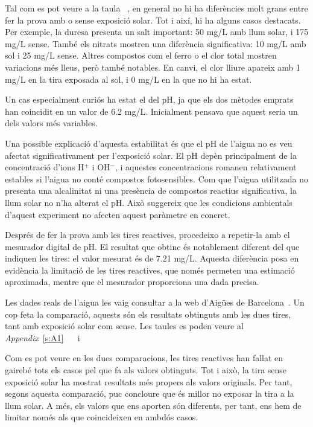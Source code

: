 Tal com es pot veure a la taula~ , en general no hi ha diferències molt grans entre fer la prova amb o sense exposició solar. Tot i així, hi ha alguns casos destacats. Per exemple, la duresa presenta un salt important: 50 mg/L amb llum solar, i 175 mg/L sense. També els nitrats mostren una diferència significativa: 10 mg/L amb sol i 25 mg/L sense. Altres compostos com el ferro o el clor total mostren variacions més lleus, però també notables. En canvi, el clor lliure apareix amb 1 mg/L en la tira exposada al sol, i 0 mg/L en la que no hi ha estat.

Un cas especialment curiós ha estat el del pH, ja que els dos mètodes emprats han coincidit en un valor de 6.2 mg/L. Inicialment pensava que aquest seria un dels valors més variables.

Una possible explicació d’aquesta estabilitat és que el pH de l’aigua no es veu afectat significativament per l’exposició solar. El pH depèn principalment de la concentració d’ions H$^+$ i OH$^-$, i aquestes concentracions romanen relativament estables si l’aigua no conté compostos fotosensibles. Com que l’aigua utilitzada no presenta una alcalinitat ni una presència de compostos reactius significativa, la llum solar no n’ha alterat el pH. Això suggereix que les condicions ambientals d’aquest experiment no afecten aquest paràmetre en concret.

Després de fer la prova amb les tires reactives, procedeixo a repetir-la amb el mesurador digital de pH. El resultat que obtinc és notablement diferent del que indiquen les tires: el valor mesurat és de 7.21 mg/L. Aquesta diferència posa en evidència la limitació de les tires reactives, que només permeten una estimació aproximada, mentre que el mesurador proporciona una dada precisa.

Les dades reals de l’aigua les vaig consultar a la web d’Aigües de Barcelona~\cite{qualitatAigua}. Un cop feta la comparació, aquests són els resultats obtinguts amb les dues tires, tant amb exposició solar com sense.
Les taules es poden veure al \textit{Appendix}~\ref{s:A1}~ ~ i~


Com es pot veure en les dues comparacions, les tires reactives han fallat en gairebé tots els casos pel que fa als valors obtinguts. Tot i això, la tira sense exposició solar ha mostrat resultats més propers als valors originals. Per tant, segons aquesta comparació, puc concloure que és millor no exposar la tira a la llum solar. A més, els valors que ens aporten són diferents, per tant, ens hem de limitar només als que coincideixen en ambdós casos.

